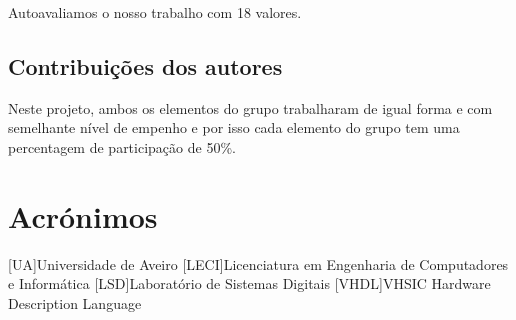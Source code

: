 \documentclass{report}
\begin{document}
Autoavaliamos o nosso trabalho com 18 valores.

\section{Contribuições dos autores}
\label{sec:contribuicoes-dos-autores}
Neste projeto, ambos os elementos do grupo trabalharam de igual forma e com semelhante nível de empenho e por isso cada elemento do grupo tem uma percentagem de participação de 50\%.

\chapter*{Acrónimos}
\begin{acronym}
    [UA]{Universidade de Aveiro}
    [LECI]{Licenciatura em Engenharia de Computadores e Informática}
    [LSD]{Laboratório de Sistemas Digitais}
    [VHDL]{VHSIC Hardware Description Language}
\end{acronym}


\printbibliography
\end{document}
